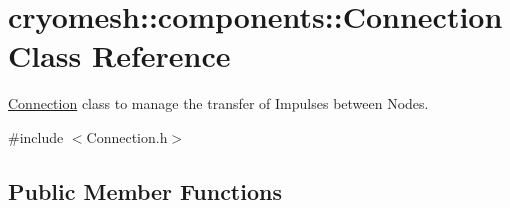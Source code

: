 \hypertarget{classcryomesh_1_1components_1_1Connection}{\section{cryomesh\-:\-:components\-:\-:\-Connection \-Class \-Reference}
\label{classcryomesh_1_1components_1_1Connection}
}


\hyperlink{classcryomesh_1_1components_1_1Connection}{\-Connection} class to manage the transfer of \-Impulses between \-Nodes.  




{\ttfamily \#include $<$\-Connection.\-h$>$}

\subsection*{\-Public \-Member \-Functions}
